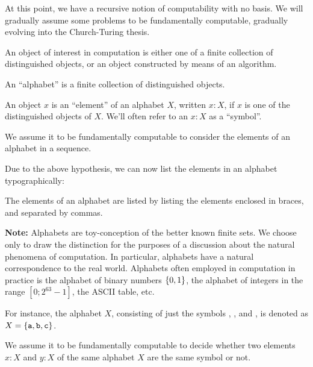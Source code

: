 At this point, we have a recursive notion of computability with no basis. We
will gradually assume some problems to be fundamentally computable, gradually
evolving into the Church-Turing thesis.

An object of interest in computation is either one of a finite collection of
distinguished objects, or an object constructed by means of an algorithm.

\begin{notion} An ``alphabet'' is a finite collection of distinguished objects.
\end{notion}

\begin{notion} An object $x$ is an ``element'' of an alphabet $X$, written $x :
X$, if $x$ is one of the distinguished objects of $X$. We'll often refer to an
$x:X$ as a ``symbol''. \end{notion}

\begin{hypothesis}

We assume it to be fundamentally computable to consider the elements of an
alphabet in a sequence.

\end{hypothesis}

Due to the above hypothesis, we can now list the elements in an alphabet
typographically:

\begin{notation}

The elements of an alphabet are listed by listing the elements enclosed in
braces, and separated by commas.

\end{notation}

\textbf{Note:} Alphabets are toy-conception of the better known finite sets. We
choose only to draw the distinction for the purposes of a discussion about the
natural phenomena of computation. In particular, alphabets have a natural
correspondence to the real world. Alphabets often employed in computation in
practice is the alphabet of binary numbers $\mathopen{}\left\{{0,1}\right\}\mathclose{}$, the alphabet of
integers in the range $[0;2^{63}-1]$, the ASCII table, etc.

For instance, the alphabet $X$, consisting of just the symbols ,
, and , is denoted as $X=\mathopen{}\left\{{\mathtt{a},\mathtt{b},\mathtt{c}}\right\}\mathclose{}$.

\begin{hypothesis} We assume it to be fundamentally computable to decide
whether two elements $x:X$ and $y:X$ of the same alphabet $X$ are the same
symbol or not. \end{hypothesis}

